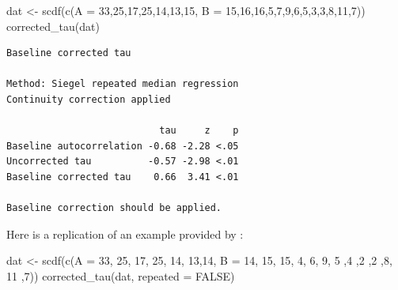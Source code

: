 \documentclass[
]{book}
\newenvironment{Shaded}{\begin{snugshade}}{\end{snugshade}}
\newcommand{\AttributeTok}[1]{\textcolor[rgb]{0.77,0.63,0.00}{#1}}
\newcommand{\ConstantTok}[1]{\textcolor[rgb]{0.00,0.00,0.00}{#1}}
\newcommand{\DecValTok}[1]{\textcolor[rgb]{0.00,0.00,0.81}{#1}}
\newcommand{\FunctionTok}[1]{\textcolor[rgb]{0.00,0.00,0.00}{#1}}
\newcommand{\NormalTok}[1]{#1}
\newcommand{\OtherTok}[1]{\textcolor[rgb]{0.56,0.35,0.01}{#1}}
\begin{document}
\begin{Shaded}
\begin{Highlighting}[]
\NormalTok{dat }\OtherTok{\textless{}{-}} \FunctionTok{scdf}\NormalTok{(}\FunctionTok{c}\NormalTok{(}\AttributeTok{A =} \DecValTok{33}\NormalTok{,}\DecValTok{25}\NormalTok{,}\DecValTok{17}\NormalTok{,}\DecValTok{25}\NormalTok{,}\DecValTok{14}\NormalTok{,}\DecValTok{13}\NormalTok{,}\DecValTok{15}\NormalTok{, }\AttributeTok{B =} \DecValTok{15}\NormalTok{,}\DecValTok{16}\NormalTok{,}\DecValTok{16}\NormalTok{,}\DecValTok{5}\NormalTok{,}\DecValTok{7}\NormalTok{,}\DecValTok{9}\NormalTok{,}\DecValTok{6}\NormalTok{,}\DecValTok{5}\NormalTok{,}\DecValTok{3}\NormalTok{,}\DecValTok{3}\NormalTok{,}\DecValTok{8}\NormalTok{,}\DecValTok{11}\NormalTok{,}\DecValTok{7}\NormalTok{))}
\FunctionTok{corrected\_tau}\NormalTok{(dat)}
\end{Highlighting}
\end{Shaded}

\begin{verbatim}
Baseline corrected tau

Method: Siegel repeated median regression
Continuity correction applied

                           tau     z    p
Baseline autocorrelation -0.68 -2.28 <.05
Uncorrected tau          -0.57 -2.98 <.01
Baseline corrected tau    0.66  3.41 <.01

Baseline correction should be applied.
\end{verbatim}

Here is a replication of an example provided by \citet{tarlowImprovedRankCorrelation2016a} :

\begin{Shaded}
\begin{Highlighting}[]
\NormalTok{dat }\OtherTok{\textless{}{-}} \FunctionTok{scdf}\NormalTok{(}\FunctionTok{c}\NormalTok{(}\AttributeTok{A =} \DecValTok{33}\NormalTok{, }\DecValTok{25}\NormalTok{, }\DecValTok{17}\NormalTok{, }\DecValTok{25}\NormalTok{, }\DecValTok{14}\NormalTok{, }\DecValTok{13}\NormalTok{,}\DecValTok{14}\NormalTok{, }\AttributeTok{B =} \DecValTok{14}\NormalTok{, }\DecValTok{15}\NormalTok{, }\DecValTok{15}\NormalTok{, }\DecValTok{4}\NormalTok{, }\DecValTok{6}\NormalTok{, }\DecValTok{9}\NormalTok{, }\DecValTok{5}\NormalTok{ ,}\DecValTok{4}\NormalTok{ ,}\DecValTok{2}\NormalTok{ ,}\DecValTok{2}\NormalTok{ ,}\DecValTok{8}\NormalTok{, }\DecValTok{11}\NormalTok{ ,}\DecValTok{7}\NormalTok{))}
\FunctionTok{corrected\_tau}\NormalTok{(dat, }\AttributeTok{repeated =} \ConstantTok{FALSE}\NormalTok{)}
\end{Highlighting}
\end{Shaded}
\end{document}
